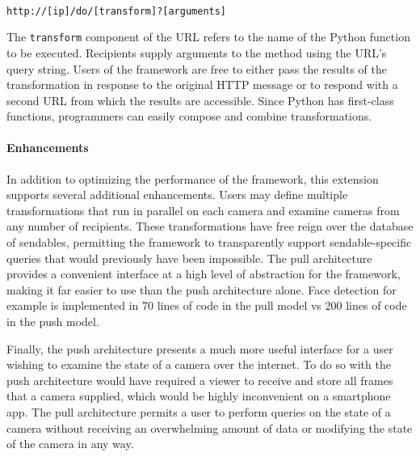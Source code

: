\texttt{\\http://[ip]/do/[transform]?[arguments]\\}

The \texttt{transform} component of the URL refers to the name of
the Python function to be executed.  Recipients supply arguments to the method using
the URL's query string.  Users of the framework are free to either
pass the results of the transformation in response to the original HTTP
message or to respond with a second URL from which the results are accessible.
Since Python has first-class functions, programmers can easily 
compose and combine transformations.

\paragraph{Enhancements}

In addition to optimizing the performance of the framework,
this extension supports several additional enhancements.  Users may 
define multiple transformations that run in parallel on each camera and
examine cameras from any number of recipients.  These transformations
have free reign over the database of sendables, permitting
the framework to transparently support sendable-specific queries that
would previously have been impossible.   The pull architecture provides a
convenient interface at a high level of abstraction for the framework, making
it far easier to use than the push architecture alone. Face detection
for example is implemented in 70 lines of code in the pull model vs 200 lines of code
in the push model.

Finally, the push architecture presents a much more useful interface
for a user wishing to examine the state of a camera over the internet.
To do so with the push architecture would have required a viewer to receive
and store all frames that a camera supplied, which would be highly inconvenient on
a smartphone app.  The pull architecture permits a user to perform queries on
the state of a camera without receiving an overwhelming amount of data or
modifying the state of the camera in any way.
